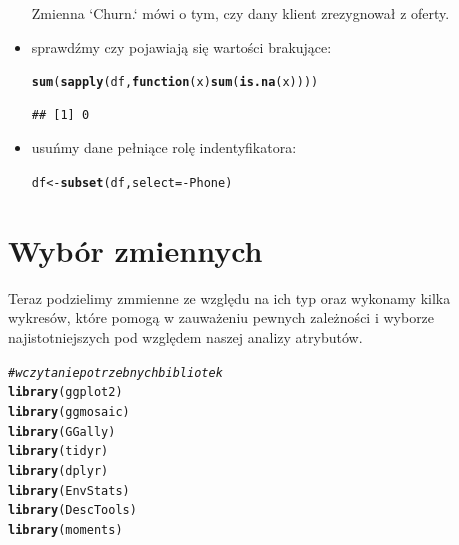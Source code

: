 \documentclass{article}\usepackage[]{graphicx}\usepackage[]{color}
\makeatletter
\newcommand{\hlcom}[1]{\textcolor[rgb]{0.678,0.584,0.686}{\textit{#1}}}%
\newcommand{\hlopt}[1]{\textcolor[rgb]{0,0,0}{#1}}%
\newcommand{\hlstd}[1]{\textcolor[rgb]{0.345,0.345,0.345}{#1}}%
\newcommand{\hlkwa}[1]{\textcolor[rgb]{0.161,0.373,0.58}{\textbf{#1}}}%
\newcommand{\hlkwb}[1]{\textcolor[rgb]{0.69,0.353,0.396}{#1}}%
\newcommand{\hlkwc}[1]{\textcolor[rgb]{0.333,0.667,0.333}{#1}}%
\newcommand{\hlkwd}[1]{\textcolor[rgb]{0.737,0.353,0.396}{\textbf{#1}}}%
\newenvironment{kframe}{%
 \def\at@end@of@kframe{}%
 \ifinner\ifhmode%
  \def\at@end@of@kframe{\end{minipage}}%
  \begin{minipage}{\columnwidth}%
 \fi\fi%
 \def\FrameCommand##1{\hskip\@totalleftmargin \hskip-\fboxsep
 \colorbox{shadecolor}{##1}\hskip-\fboxsep
     \hskip-\linewidth \hskip-\@totalleftmargin \hskip\columnwidth}%
 \MakeFramed {\advance\hsize-\width
   \@totalleftmargin\z@ \linewidth\hsize
   \@setminipage}}%
 {\par\unskip\endMakeFramed%
 \at@end@of@kframe}
\newenvironment{knitrout}{}{} %
\makeatother
\begin{document}
\begin{itemize}
Zmienna `Churn.` mówi o tym, czy dany klient zrezygnował z oferty.

\item sprawdźmy czy pojawiają się wartości brakujące:
\begin{knitrout}
\color{fgcolor}\begin{kframe}
\begin{alltt}
\hlkwd{sum}\hlstd{(}\hlkwd{sapply}\hlstd{(df,} \hlkwa{function}\hlstd{(}\hlkwc{x}\hlstd{)} \hlkwd{sum}\hlstd{(}\hlkwd{is.na}\hlstd{(x))))}
\end{alltt}
\begin{verbatim}
## [1] 0
\end{verbatim}
\end{kframe}
\end{knitrout}

\item usuńmy dane pełniące rolę indentyfikatora:
\begin{knitrout}
\color{fgcolor}\begin{kframe}
\begin{alltt}
\hlstd{df} \hlkwb{<-} \hlkwd{subset}\hlstd{(df,} \hlkwc{select}\hlstd{=}\hlopt{-}\hlstd{Phone)}
\end{alltt}
\end{kframe}
\end{knitrout}

\end{itemize}

\section{Wybór zmiennych}
Teraz podzielimy zmmienne ze względu na ich typ oraz wykonamy kilka wykresów, które pomogą w zauważeniu pewnych zależności i wyborze najistotniejszych pod względem naszej analizy atrybutów.
\begin{knitrout}
\color{fgcolor}\begin{kframe}
\begin{alltt}
\hlcom{# wczytanie potrzebnych bibliotek}
\hlkwd{library}\hlstd{(ggplot2)}
\hlkwd{library}\hlstd{(ggmosaic)}
\hlkwd{library}\hlstd{(GGally)}
\hlkwd{library}\hlstd{(tidyr)}
\hlkwd{library}\hlstd{(dplyr)}
\hlkwd{library}\hlstd{(EnvStats)}
\hlkwd{library}\hlstd{(DescTools)}
\hlkwd{library}\hlstd{(moments)}
\end{alltt}
\end{kframe}
\end{knitrout}
\end{document}
